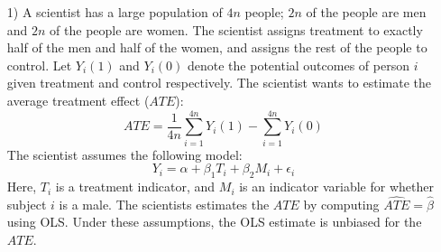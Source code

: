\documentclass{article}
\begin{document}
  \begin{itemize}
    \item[1)]
      A scientist has a large population of $4n$ people;
      $2n$ of the people are men and $2n$ of the people are women.
      The scientist assigns treatment to exactly half of the men and half of the women,
      and assigns the rest of the people to control.
      Let $Y_i(1)$ and $Y_i(0)$ denote the potential outcomes
      of person $i$ given treatment and control respectively.
      The scientist wants to estimate the average treatment effect ($ATE$):
      $$
        ATE = \frac{1}{4n}\sum_{i=1}^{4n}Y_i(1) - \sum_{i=1}^{4n} Y_i(0)
      $$
      The scientist assumes the following model:
      $$
        Y_i = \alpha + \beta_1 T_i + \beta_2 M_i + \epsilon_i
      $$
      Here, $T_i$ is a treatment indicator, and
      $M_i$ is an indicator variable for whether
      subject $i$ is a male.
      The scientists estimates the $ATE$ by computing $\widehat{ATE} = \hat\beta$ 
      using OLS. 
      Under these assumptions, the OLS estimate is unbiased for the $ATE$.


\end{itemize}
\end{document}
